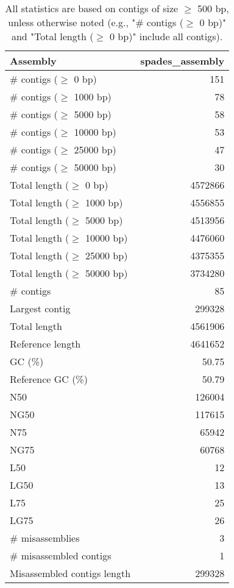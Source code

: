 \documentclass[12pt,a4paper]{article}
\begin{document}
\begin{table}[ht]
\begin{center}
\caption{All statistics are based on contigs of size $\geq$ 500 bp, unless otherwise noted (e.g., "\# contigs ($\geq$ 0 bp)" and "Total length ($\geq$ 0 bp)" include all contigs).}
\begin{tabular}{|l*{1}{|r}|}
\hline
Assembly & spades\_assembly \\ \hline
\# contigs ($\geq$ 0 bp) & 151 \\ \hline
\# contigs ($\geq$ 1000 bp) & 78 \\ \hline
\# contigs ($\geq$ 5000 bp) & 58 \\ \hline
\# contigs ($\geq$ 10000 bp) & 53 \\ \hline
\# contigs ($\geq$ 25000 bp) & 47 \\ \hline
\# contigs ($\geq$ 50000 bp) & 30 \\ \hline
Total length ($\geq$ 0 bp) & 4572866 \\ \hline
Total length ($\geq$ 1000 bp) & 4556855 \\ \hline
Total length ($\geq$ 5000 bp) & 4513956 \\ \hline
Total length ($\geq$ 10000 bp) & 4476060 \\ \hline
Total length ($\geq$ 25000 bp) & 4375355 \\ \hline
Total length ($\geq$ 50000 bp) & 3734280 \\ \hline
\# contigs & 85 \\ \hline
Largest contig & 299328 \\ \hline
Total length & 4561906 \\ \hline
Reference length & 4641652 \\ \hline
GC (\%) & 50.75 \\ \hline
Reference GC (\%) & 50.79 \\ \hline
N50 & 126004 \\ \hline
NG50 & 117615 \\ \hline
N75 & 65942 \\ \hline
NG75 & 60768 \\ \hline
L50 & 12 \\ \hline
LG50 & 13 \\ \hline
L75 & 25 \\ \hline
LG75 & 26 \\ \hline
\# misassemblies & 3 \\ \hline
\# misassembled contigs & 1 \\ \hline
Misassembled contigs length & 299328 \\ \hline

\end{tabular}
\end{center}
\end{table}
\end{document}
